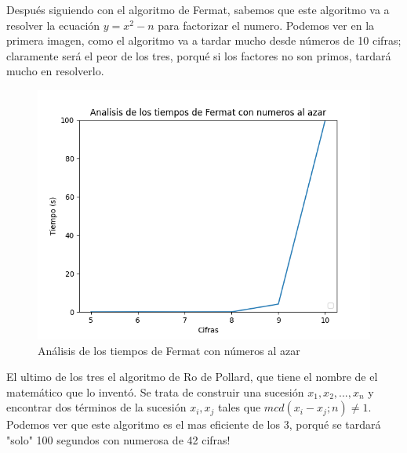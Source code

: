 \documentclass{article}
\begin{document}
    \newpage
    
     Después siguiendo con el algoritmo de Fermat, sabemos que este algoritmo va a resolver la ecuación \begin{math} y = x ^{2} - n \end{math} para factorizar el numero. Podemos ver en la primera imagen, como el algoritmo va a tardar mucho desde números de 10 cifras; claramente será el peor de los tres, porqué si los factores no son primos, tardará mucho en resolverlo.
    
    
    
    \begin{figure}[ht!]
        \centering
        \includegraphics[scale=0.3]{Figure_3}
        \caption{Análisis de los tiempos de Fermat con números al azar}
        \label{fig:Figure_3}
    \end{figure}
    
    \newpage
    
    
    El ultimo de los tres el algoritmo de Ro de Pollard, que tiene el nombre de el matemático que lo inventó. Se trata de construir una sucesión 
    \begin{math}
         x_{1}, x_{2}, ..., x_{n} 
    \end{math} y encontrar dos términos de la sucesión 
    \begin{math} 
        x_{i}, x_{j}
    \end{math} tales que 
    \begin{math}
    mcd(x_{i} - x_{j} ; n) \neq 1.
    \end{math}
    Podemos ver que este algoritmo es el mas eficiente de los 3, porqué se tardará "solo" 100 segundos con numerosa de 42 cifras!
    
\end{document}
